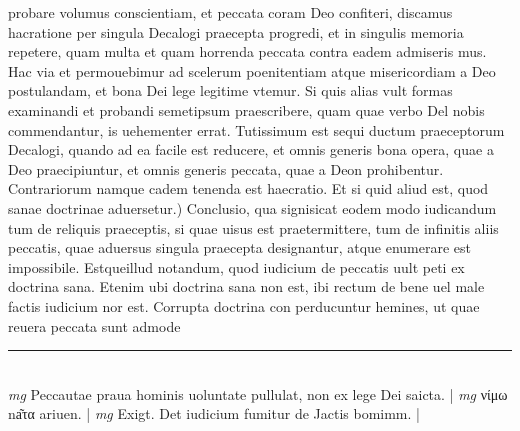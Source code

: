\documentclass{article}
\begin{document}
\begin{pages}
probare volumus conscientiam, et peccata coram Deo confiteri, discamus hacratione per singula Decalogi praecepta progredi, et in singulis memoria repetere, quam multa et quam horrenda peccata contra eadem admiseris mus. Hac via et permouebimur ad scelerum poenitentiam atque misericordiam a Deo postulandam, et bona Dei lege legitime vtemur. Si quis alias vult formas examinandi et probandi semetipsum praescribere, quam quae verbo Del nobis commendantur, is uehementer errat. Tutissimum est sequi ductum praeceptorum Decalogi, quando ad ea facile est reducere, et omnis generis bona opera, quae a Deo praecipiuntur, et omnis generis peccata, quae a Deon prohibentur. Contrariorum namque  cadem tenenda est haecratio.  \pend\pstart Et si quid aliud est, quod sanae doctrinae aduersetur.) Conclusio, qua signisicat eodem modo iudicandum tum de reliquis praeceptis, si quae uisus est praetermittere, tum de infinitis aliis peccatis, quae aduersus singula praecepta designantur, atque enumerare est impossibile. Estqueillud notandum, quod iudicium de peccatis uult peti ex doctrina sana. Etenim ubi doctrina sana non est, ibi rectum de bene uel male factis iudicium nor est. Corrupta doctrina con perducuntur hemines, ut quae reuera peccata sunt admode  \pend
\vspace{0.5cm}\noindent
\vspace{0.2cm}\rule{1cm}{0.2pt}\\ 
\hspace{0.2cm}\textit{mg}
\footnotesize Peccautae praua hominis uoluntate pullulat, non ex lege Dei saicta. 
\normalsize| 
\hspace{0.2cm}\textit{mg}
\footnotesize νίμω na͂τα ariuen. 
\normalsize| 
\hspace{0.2cm}\textit{mg}
\footnotesize Exigt. Det iudicium fumitur de Jactis bomimm. 
\normalsize| 

\end{pages}
\end{document}
